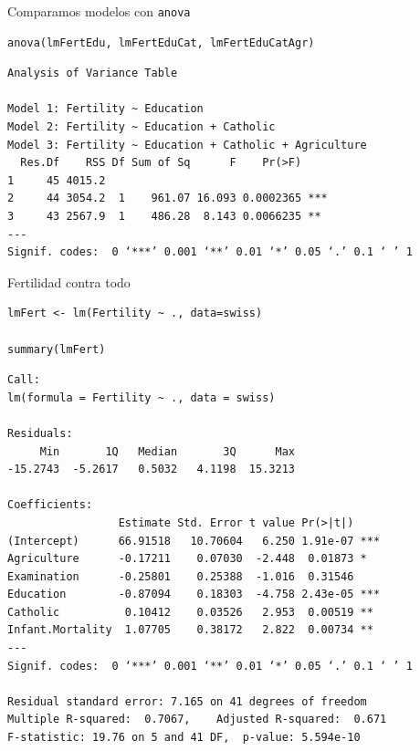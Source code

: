 \documentclass[xcolor={usenames,svgnames,dvipsnames}]{beamer}
\begin{document}
\begin{frame}[fragile,label=sec-5-10]{Comparamos modelos con \texttt{anova}}
 \lstset{language=R,label= ,caption= ,numbers=none}
\begin{lstlisting}
anova(lmFertEdu, lmFertEduCat, lmFertEduCatAgr)
\end{lstlisting}

\begin{verbatim}
Analysis of Variance Table

Model 1: Fertility ~ Education
Model 2: Fertility ~ Education + Catholic
Model 3: Fertility ~ Education + Catholic + Agriculture
  Res.Df    RSS Df Sum of Sq      F    Pr(>F)    
1     45 4015.2                                  
2     44 3054.2  1    961.07 16.093 0.0002365 ***
3     43 2567.9  1    486.28  8.143 0.0066235 ** 
---
Signif. codes:  0 ‘***’ 0.001 ‘**’ 0.01 ‘*’ 0.05 ‘.’ 0.1 ‘ ’ 1
\end{verbatim}
\end{frame}

\begin{frame}[fragile,label=sec-5-11]{Fertilidad contra todo}
 \lstset{language=R,label= ,caption= ,numbers=none}
\begin{lstlisting}
lmFert <- lm(Fertility ~ ., data=swiss)

summary(lmFert)
\end{lstlisting}

\begin{verbatim}
Call:
lm(formula = Fertility ~ ., data = swiss)

Residuals:
     Min       1Q   Median       3Q      Max 
-15.2743  -5.2617   0.5032   4.1198  15.3213 

Coefficients:
                 Estimate Std. Error t value Pr(>|t|)    
(Intercept)      66.91518   10.70604   6.250 1.91e-07 ***
Agriculture      -0.17211    0.07030  -2.448  0.01873 *  
Examination      -0.25801    0.25388  -1.016  0.31546    
Education        -0.87094    0.18303  -4.758 2.43e-05 ***
Catholic          0.10412    0.03526   2.953  0.00519 ** 
Infant.Mortality  1.07705    0.38172   2.822  0.00734 ** 
---
Signif. codes:  0 ‘***’ 0.001 ‘**’ 0.01 ‘*’ 0.05 ‘.’ 0.1 ‘ ’ 1

Residual standard error: 7.165 on 41 degrees of freedom
Multiple R-squared:  0.7067,	Adjusted R-squared:  0.671 
F-statistic: 19.76 on 5 and 41 DF,  p-value: 5.594e-10
\end{verbatim}
\end{frame}
\end{document}
